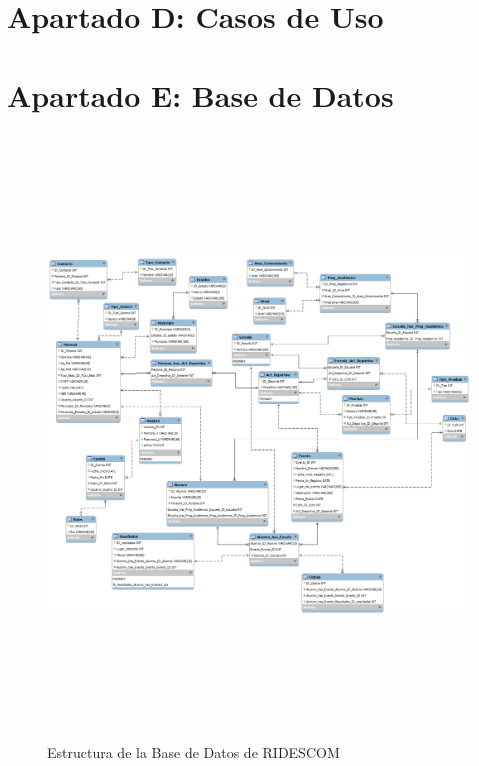	\section{Apartado D: Casos de Uso}
		\label{CasosdeUso}
		
		
		
		
		
		
	
	\section{Apartado E: Base de Datos}
		\label{BasedeDatos}
		\begin{figure}[hbt!]
			\centering
			\includegraphics[width=14cm, height=16cm]{Imagenes/Disenos/BasedeDatos.png}
			\caption{Estructura de la Base de Datos de RIDESCOM}
			\label{BaseDatos}
		\end{figure}
	
